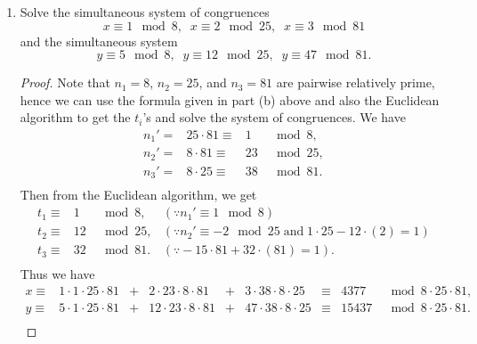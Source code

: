 \documentclass{article}
\begin{document}
\begin{enumerate}[label={\bf(\alph*)}]
    \item Solve the simultaneous system of congruences
      \[x\equiv1\mod{8},\;\; x\equiv2\mod{25},\;\; x\equiv3\mod{81}\]
      and the simultaneous system
      \[y\equiv5\mod{8},\;\; y\equiv12\mod{25},\;\; y\equiv47\mod{81}.\]

      \begin{proof}
        Note that $n_1=8$, $n_2=25$, and $n_3=81$ are pairwise relatively
        prime, hence we can use the formula given in part (b) above and
        also the Euclidean algorithm to get the $t_i$'s and solve the
        system of congruences. We have
        \[\begin{array}{lrrl}
          n_1'= &25\cdot81\equiv &1  &\mod{8}, \\
          n_2'= &8\cdot81\equiv  &23 &\mod{25}, \\
          n_3'= &8\cdot25\equiv  &38 &\mod{81}. \\
        \end{array}\]
        Then from the Euclidean algorithm, we get
        \[\begin{array}{lrll}
          t_1\equiv &1  &\mod{8},  &(\because n_1'\equiv1\mod{8}) \\
          t_2\equiv &12 &\mod{25}, &(\because n_2'\equiv-2\mod{25}\;
            \text{and}\; 1\cdot25-12\cdot(2)=1) \\
          t_3\equiv &32 &\mod{81}. &(\because -15\cdot81+32\cdot(81)=1). \\
        \end{array}\]
        Thus we have
        \[\begin{array}{llcrcrcrr}
          x\equiv &1\cdot1\cdot25\cdot81 &+ &2\cdot23\cdot8\cdot81
            &+ &3\cdot38\cdot8\cdot25 &\equiv &4377 &\mod{8\cdot25\cdot81},
            \\
          y\equiv &5\cdot1\cdot25\cdot81 &+ &12\cdot23\cdot8\cdot81
            &+ &47\cdot38\cdot8\cdot25 &\equiv &15437
            &\mod{8\cdot25\cdot81}. \\
        \end{array}\]
      \end{proof}
  \end{enumerate}
\end{document}
